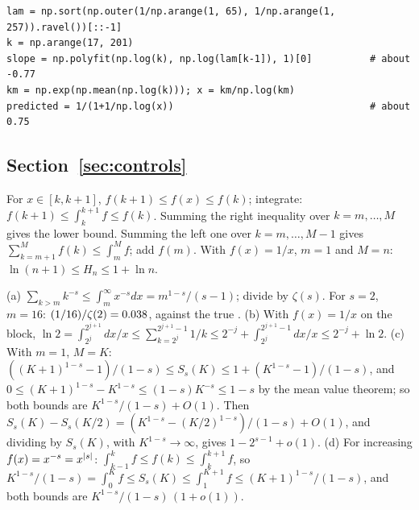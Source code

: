 \begin{verbatim}
lam = np.sort(np.outer(1/np.arange(1, 65), 1/np.arange(1, 257)).ravel())[::-1]
k = np.arange(17, 201)
slope = np.polyfit(np.log(k), np.log(lam[k-1]), 1)[0]          # about -0.77
km = np.exp(np.mean(np.log(k))); x = km/np.log(km)
predicted = 1/(1+1/np.log(x))                                  # about 0.75
\end{verbatim}

\subsection*{Section~\ref{sec:controls}}

For $x\in[k,k+1]$, $f(k+1)\le f(x)\le f(k)$; integrate: $f(k+1)\le\int_k^{k+1}f\le f(k)$. Summing the right
inequality over $k=m,\dots,M$ gives the lower bound. Summing the left one over $k=m,\dots,M-1$ gives
$\sum_{k=m+1}^Mf(k)\le\int_m^Mf$; add $f(m)$. With $f(x)=1/x$, $m=1$ and $M=n$: $\ln(n+1)\le H_n\le1+\ln n$.

(a) $\sum_{k>m}k^{-s}\le\int_m^\infty x^{-s}dx=m^{1-s}/(s-1)$; divide by $\zeta(s)$. For $s=2$, $m=16$:
$(1/16)/\zeta(2)=0.038$, against the true \NumTailTrueTwo.
\newline (b) With $f(x)=1/x$ on the block, $\ln2=\int_{2^j}^{2^{j+1}}dx/x\le\sum_{k=2^j}^{2^{j+1}-1}1/k\le2^{-j}+\int_{2^j}^{2^{j+1}-1}dx/x\le2^{-j}+\ln2$.
\newline (c) With $m=1$, $M=K$: $((K+1)^{1-s}-1)/(1-s)\le S_s(K)\le1+(K^{1-s}-1)/(1-s)$, and
$0\le(K+1)^{1-s}-K^{1-s}\le(1-s)K^{-s}\le1-s$ by the mean value theorem; so both bounds are $K^{1-s}/(1-s)+O(1)$. Then
$S_s(K)-S_s(K/2)=(K^{1-s}-(K/2)^{1-s})/(1-s)+O(1)$, and dividing by $S_s(K)$, with $K^{1-s}\to\infty$, gives
$1-2^{s-1}+o(1)$.
\newline (d) For increasing $f(x)=x^{-s}=x^{\lvert s\rvert}$: $\int_{k-1}^kf\le f(k)\le\int_k^{k+1}f$, so
$K^{1-s}/(1-s)=\int_0^Kf\le S_s(K)\le\int_1^{K+1}f\le(K+1)^{1-s}/(1-s)$, and both bounds are
$K^{1-s}/(1-s)\,(1+o(1))$.


